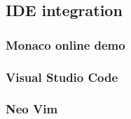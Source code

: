 \subsection{IDE integration}

\subsubsection{Monaco online demo}
\subsubsection{Visual Studio Code}
\subsubsection{Neo Vim}


